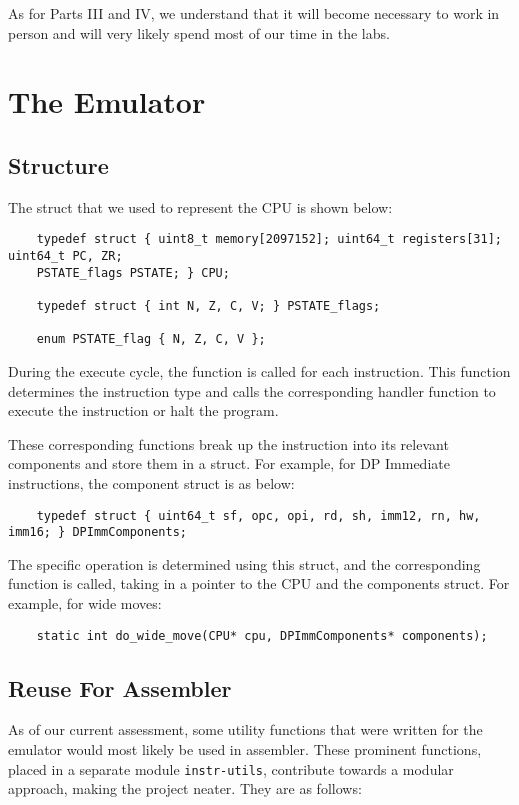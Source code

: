 \documentclass[a4paper, 10pt]{article}
\begin{document}
As for Parts III and IV, we understand that it will become necessary to work in person and will very likely spend most of our time in the labs.

\section{The Emulator}
\subsection{Structure}
The struct that we used to represent the CPU is shown below:
\begin{verbatim}
    typedef struct { uint8_t memory[2097152]; uint64_t registers[31]; uint64_t PC, ZR;
    PSTATE_flags PSTATE; } CPU;
    
    typedef struct { int N, Z, C, V; } PSTATE_flags;

    enum PSTATE_flag { N, Z, C, V };
\end{verbatim}
During the execute cycle, the function  is called for each instruction. This function determines the instruction type and calls the corresponding handler function to execute the instruction or halt the program.

These corresponding functions break up the instruction into its relevant components and store them in a struct. For example, for DP Immediate instructions, the component struct is as below:
\begin{verbatim}
    typedef struct { uint64_t sf, opc, opi, rd, sh, imm12, rn, hw, imm16; } DPImmComponents;
\end{verbatim}
The specific operation is determined using this struct, and the corresponding function is called, taking in a pointer to the CPU and the components struct. For example, for wide moves:
\begin{verbatim}
    static int do_wide_move(CPU* cpu, DPImmComponents* components);
\end{verbatim}

\subsection{Reuse For Assembler}

As of our current assessment, some utility functions that were written for the emulator would most likely be used in assembler. These prominent functions, placed in a separate module \texttt{instr-utils}, contribute towards a modular approach, making the project neater. They are as follows:
\end{document}
